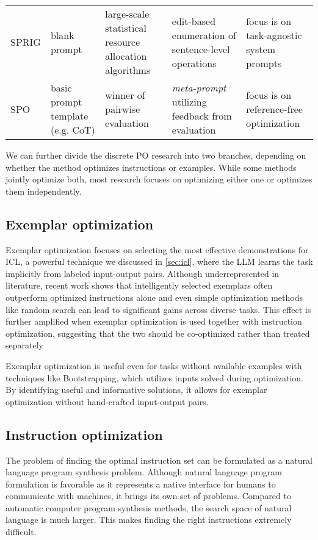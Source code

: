 \begin{landscape}
\begin{table}[htbp]
\begin{tabularx}{\linewidth}{@{}l Y Y Y Y@{}}
SPRIG\cite{zhang2024sprigimprovinglargelanguage} & blank prompt & large-scale statistical resource allocation algorithms & edit-based enumeration of sentence-level operations & focus is on task-agnostic system prompts \\
SPO\cite{xiang2025selfsupervisedpromptoptimization} & basic prompt template (e.g. CoT) & winner of pairwise evaluation & \textit{meta-prompt} utilizing feedback from evaluation & focus is on reference-free optimization\\
\bottomrule
\end{tabularx}
\end{table}
\end{landscape}

We can further divide the discrete PO research into two branches, depending on whether 
the method optimizes instructions or examples. While some methods jointly optimize both, most
research focuses on optimizing either one or optimizes them independently. 

\subsection{Exemplar optimization}

Exemplar optimization focuses on selecting the most effective demonstrations for ICL, a powerful technique we discussed in \ref{sec:icl},
where the LLM learns the task implicitly from labeled input-output pairs. Although underrepresented in literature\cite{wan2024teachbettersmarterinstructions},
recent work\cite{opsahlong2024optimizinginstructionsdemonstrationsmultistage}\cite{wan2024teachbettersmarterinstructions} shows that intelligently selected
exemplars often outperform optimized instructions alone and even simple optimization methods like random search can lead to significant gains across diverse tasks.
This effect is further amplified when exemplar optimization is used together with instruction optimization, suggesting that the two should be co-optimized rather than treated separately\cite{wan2024teachbettersmarterinstructions}

Exemplar optimization is useful even for tasks without available examples with techniques like Bootstrapping\cite{khattab2023dspycompilingdeclarativelanguage},
which utilizes inputs solved during optimization. By identifying useful and informative solutions, it allows for exemplar optimization without hand-crafted input-output pairs.


\subsection{Instruction optimization}
The problem of finding the optimal instruction set can be formulated as a natural language program synthesis problem\cite{zhou2023largelanguagemodelshumanlevel}.
Although natural language program formulation is favorable as it represents a 
native interface for humans to communicate with machines, it brings its own set of problems.
Compared to automatic computer program synthesis methods, the search space of natural language is much larger. 
This makes finding the right instructions extremely difficult. 

